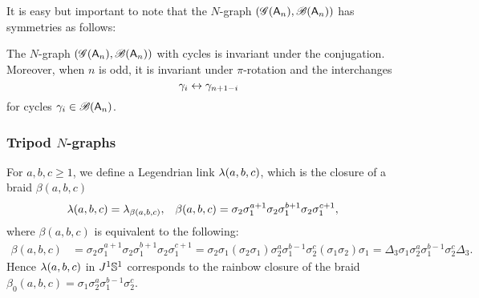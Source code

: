 It is easy but important to note that the $N$-graph $(\mathscr{G}(\mathsf{A}_n),\mathscr{B}(\mathsf{A}_n))$ has symmetries as follows:
\begin{lemma}
The $N$-graph $(\mathscr{G}(\mathsf{A}_n),\mathscr{B}(\mathsf{A}_n))$ with cycles is invariant under the conjugation.
Moreover, when $n$ is odd, it is invariant under $\pi$-rotation and the interchanges
\[
\gamma_i \leftrightarrow \gamma_{n+1-i}
\]
for cycles $\gamma_i\in \mathscr{B}(\mathsf{A}_n)$.
\end{lemma}




\subsubsection{Tripod \texorpdfstring{$N$-graphs}{N-graphs}}\label{sec:tripods}
For $a,b,c\ge 1$, we define a Legendrian link $\lambda(a,b,c)$, which is the closure of a braid $\beta(a,b,c)$
\begin{align*}
\lambda(a,b,c) &= \lambda_{\beta(a,b,c)},&
\beta(a,b,c)&=\sigma_2\sigma_1^{a+1}\sigma_2\sigma_1^{b+1}\sigma_2\sigma_1^{c+1},
\end{align*}
where $\beta(a,b,c)$ is equivalent to the following:
\begin{align*}
\beta(a,b,c)&=\sigma_2\sigma_1^{a+1}\sigma_2\sigma_1^{b+1}\sigma_2\sigma_1^{c+1}
=\sigma_2\sigma_1(\sigma_2\sigma_1)\sigma_2^a\sigma_1^{b-1}\sigma_2^c(\sigma_1\sigma_2)\sigma_1
=\Delta_3\sigma_1\sigma_2^a\sigma_1^{b-1}\sigma_2^c\Delta_3.
\end{align*}
Hence $\lambda(a,b,c)$ in $J^1\mathbb{S}^1$ corresponds to the rainbow closure of the braid $\beta_0(a,b,c)=\sigma_1\sigma_2^a\sigma_1^{b-1}\sigma_2^c$.
